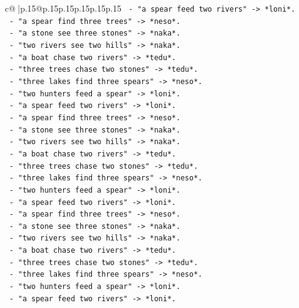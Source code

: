 \documentclass{article}
\begin{document}
{\begin{supertabular}{c@{$\;$}|p{.15\linewidth}@{}p{.15\linewidth}p{.15\linewidth}p{.15\linewidth}p{.15\linewidth}p{.15\linewidth}}
{{{\texttt{           {-} "a spear feed two rivers" {-}> *loni*.} \\
\texttt{           {-} "a spear find three trees" {-}> *neso*.} \\
\texttt{           {-} "a stone see three stones" {-}> *naka*.} \\
\texttt{           {-} "two rivers see two hills" {-}> *naka*.} \\
\texttt{           {-} "a boat chase two rivers" {-}> *tedu*.} \\
\texttt{           {-} "three trees chase two stones" {-}> *tedu*.} \\
\texttt{           {-} "three lakes find three spears" {-}> *neso*.} \\
\texttt{           {-} "two hunters feed a spear" {-}> *loni*.} \\
\texttt{           {-} "a spear feed two rivers" {-}> *loni*.} \\
\texttt{           {-} "a spear find three trees" {-}> *neso*.} \\
\texttt{           {-} "a stone see three stones" {-}> *naka*.} \\
\texttt{           {-} "two rivers see two hills" {-}> *naka*.} \\
\texttt{           {-} "a boat chase two rivers" {-}> *tedu*.} \\
\texttt{           {-} "three trees chase two stones" {-}> *tedu*.} \\
\texttt{           {-} "three lakes find three spears" {-}> *neso*.} \\
\texttt{           {-} "two hunters feed a spear" {-}> *loni*.} \\
\texttt{           {-} "a spear feed two rivers" {-}> *loni*.} \\
\texttt{           {-} "a spear find three trees" {-}> *neso*.} \\
\texttt{           {-} "a stone see three stones" {-}> *naka*.} \\
\texttt{           {-} "two rivers see two hills" {-}> *naka*.} \\
\texttt{           {-} "a boat chase two rivers" {-}> *tedu*.} \\
\texttt{           {-} "three trees chase two stones" {-}> *tedu*.} \\
\texttt{           {-} "three lakes find three spears" {-}> *neso*.} \\
\texttt{           {-} "two hunters feed a spear" {-}> *loni*.} \\
\texttt{           {-} "a spear feed two rivers" {-}> *loni*.} \\
}}}
\end{supertabular}}
\end{document}
